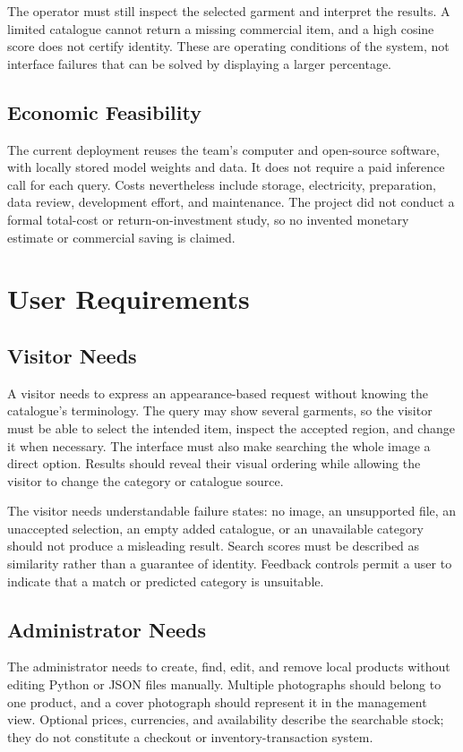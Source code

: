 The operator must still inspect the selected garment and interpret the results.
A limited catalogue cannot return a missing commercial item, and a high cosine
score does not certify identity. These are operating conditions of the system,
not interface failures that can be solved by displaying a larger percentage.

\subsection{Economic Feasibility}
The current deployment reuses the team's computer and open-source software, with
locally stored model weights and data. It does not require a paid inference call
for each query. Costs nevertheless include storage, electricity, preparation,
data review, development effort, and maintenance. The project did not conduct
a formal total-cost or return-on-investment study, so no invented monetary
estimate or commercial saving is claimed.

\section{User Requirements}
\subsection{Visitor Needs}
A visitor needs to express an appearance-based request without knowing the
catalogue's terminology. The query may show several garments, so the visitor
must be able to select the intended item, inspect the accepted region, and change
it when necessary. The interface must also make searching the whole image a
direct option. Results should reveal their visual ordering while allowing the
visitor to change the category or catalogue source.

The visitor needs understandable failure states: no image, an unsupported file,
an unaccepted selection, an empty added catalogue, or an unavailable category
should not produce a misleading result. Search scores must be described as
similarity rather than a guarantee of identity. Feedback controls permit a user
to indicate that a match or predicted category is unsuitable.

\subsection{Administrator Needs}
The administrator needs to create, find, edit, and remove local products without
editing Python or JSON files manually. Multiple photographs should belong to
one product, and a cover photograph should represent it in the management view.
Optional prices, currencies, and availability describe the searchable stock;
they do not constitute a checkout or inventory-transaction system.

